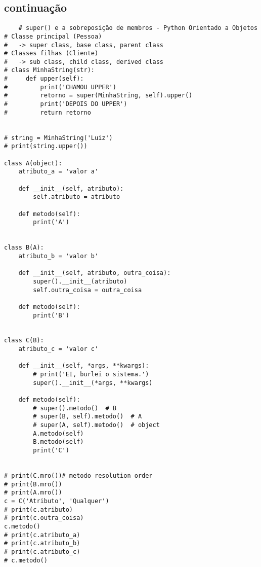 \documentclass{article}
\begin{document}
\subsection{continuação}
\begin{lstlisting}
    # super() e a sobreposição de membros - Python Orientado a Objetos
# Classe principal (Pessoa)
#   -> super class, base class, parent class
# Classes filhas (Cliente)
#   -> sub class, child class, derived class
# class MinhaString(str):
#     def upper(self):
#         print('CHAMOU UPPER')
#         retorno = super(MinhaString, self).upper()
#         print('DEPOIS DO UPPER')
#         return retorno


# string = MinhaString('Luiz')
# print(string.upper())

class A(object):
    atributo_a = 'valor a'

    def __init__(self, atributo):
        self.atributo = atributo

    def metodo(self):
        print('A')


class B(A):
    atributo_b = 'valor b'

    def __init__(self, atributo, outra_coisa):
        super().__init__(atributo)
        self.outra_coisa = outra_coisa

    def metodo(self):
        print('B')


class C(B):
    atributo_c = 'valor c'

    def __init__(self, *args, **kwargs):
        # print('EI, burlei o sistema.')
        super().__init__(*args, **kwargs)

    def metodo(self):
        # super().metodo()  # B
        # super(B, self).metodo()  # A
        # super(A, self).metodo()  # object
        A.metodo(self)
        B.metodo(self)
        print('C')


# print(C.mro())# metodo resolution order
# print(B.mro())
# print(A.mro())
c = C('Atributo', 'Qualquer')
# print(c.atributo)
# print(c.outra_coisa)
c.metodo()
# print(c.atributo_a)
# print(c.atributo_b)
# print(c.atributo_c)
# c.metodo()
    
\end{lstlisting}


\section{}
\begin{lstlisting}
    
\end{lstlisting}

\section{}
\begin{lstlisting}
    
\end{lstlisting}
\end{document}
